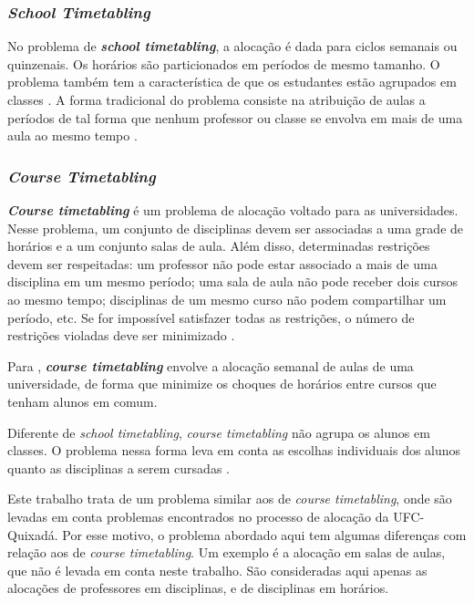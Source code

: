 \subsubsection{\textit{School Timetabling}}

No problema de \textbf{\textit{school timetabling}}, a alocação é dada para ciclos semanais ou quinzenais. Os horários são particionados em períodos de mesmo tamanho. O problema também tem a característica de que os estudantes estão agrupados em classes \cite{kingston2004tiling}. A forma tradicional do problema consiste na atribuição de aulas a períodos de tal forma que nenhum professor ou classe se envolva em mais de uma aula ao mesmo tempo \cite{vslechta2004decomposition}. 

\subsubsection{\textit{Course Timetabling}}

\textbf{\textit{Course timetabling}} é um problema de alocação voltado para as universidades. Nesse problema, um conjunto de disciplinas devem ser associadas a uma grade de horários e a um conjunto salas de aula. Além disso, determinadas restrições devem ser respeitadas: um professor não pode estar associado a mais de uma disciplina em um mesmo período; uma sala de aula não pode receber dois cursos ao mesmo tempo; disciplinas de um mesmo curso não podem compartilhar um período, etc. Se for impossível satisfazer todas as restrições, o número de restrições violadas deve ser minimizado \cite{lach2012curriculum}.

Para , \textit{\textbf{course timetabling}} envolve a alocação semanal de aulas de uma universidade, de forma que minimize os choques de horários entre cursos que tenham alunos em comum.

Diferente de \textit{school timetabling}, \textit{course timetabling} não agrupa os alunos em classes. O problema nessa forma leva em conta as escolhas individuais dos alunos quanto as disciplinas a serem cursadas \cite{kingston2004tiling}.

Este trabalho trata de um problema similar aos de \textit{course timetabling}, onde são levadas em conta problemas encontrados no processo de alocação da UFC-Quixadá. Por esse motivo, o problema abordado aqui tem algumas diferenças com relação aos de \textit{course timetabling}. Um exemplo é a alocação em salas de aulas, que não é levada em conta neste trabalho. São consideradas aqui apenas as alocações de professores em disciplinas, e de disciplinas em horários. 

